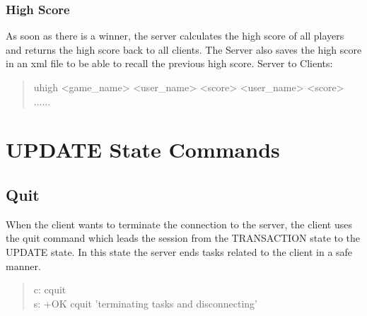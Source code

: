 \documentclass[a4paper,11pt]{article}
\begin{document}
\subsubsection{High Score}
As soon as there is a winner, the server calculates the high score of all players and returns the high score back to all clients. The Server also saves the high score in an xml file to be able to recall the previous high score.
Server to Clients:
\begin{quote}
  uhigh <game\_name> <user\_name> <score> <user\_name> <score> ......
\end{quote} 


\clearpage
\section{UPDATE State Commands}
\subsection{Quit}
When the client wants to terminate the connection to the server, the client uses the quit command which leads the session from the TRANSACTION state to the UPDATE state. In this state the server ends tasks related to the client in a safe manner.

\begin{quote}
  c: cquit\\
  s: +OK cquit 'terminating tasks and disconnecting'
\end{quote}
\end{document}
